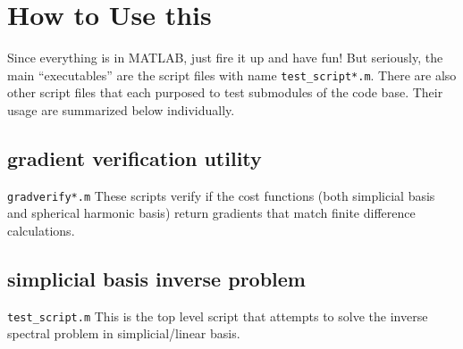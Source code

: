 \documentclass[11pt]{article}
\theoremstyle{definition}
\begin{document}
\section{How to Use this}
Since everything is in MATLAB, just fire it up and have fun! But seriously, the main ``executables'' are the script files with name \verb|test_script*.m|. There are also other script files that each purposed to test submodules of the code base. Their usage are summarized below individually.
\subsection{gradient verification utility}
\verb|gradverify*.m|
These scripts verify if the cost functions (both simplicial basis and spherical harmonic basis) return gradients that match finite difference calculations.
\subsection{simplicial basis inverse problem}
\verb|test_script.m|
This is the top level script that attempts to solve the inverse spectral problem in simplicial/linear basis. 
\end{document}
